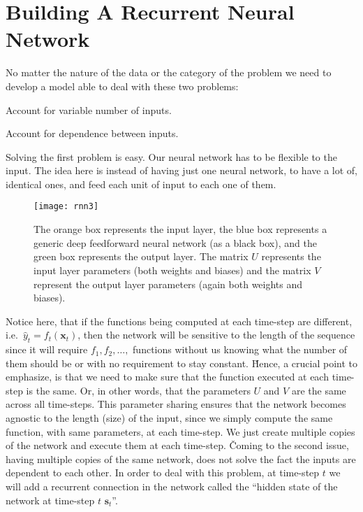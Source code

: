\section{Building A Recurrent Neural Network}

No matter the nature of the data or the category of the problem we need to develop a model able to deal with these
two problems:
\bit
\item Account for variable number of inputs.
\item Account for dependence between inputs.
\eit

Solving the first problem is easy. Our neural network has to be flexible to the input. The idea here is instead of
having just one neural network, to have a lot of, identical ones, and feed each unit of input to each one of them.

\begin{figure}[H]
\texttt{[image: rnn3]}
\centering
\captionsetup{labelformat=empty}
\caption{The orange box represents the input layer, the blue box represents a generic deep feedforward neural
network (as a black box), and the green box represents the output layer. The matrix $U$ represents the input layer
parameters (both weights and biases) and the matrix $V$ represent the output layer parameters (again both weights and
biases).}
\end{figure}

Notice here, that if the functions being computed at each time-step are different, i.e.\ $\hat{y}_t = f_t(\boldsymbol{x}_{t})$,
then the network will be sensitive to the length of the sequence since it will require $f_1, f_2, \ldots,$ functions
without us knowing what the number of them should be or with no requirement to stay constant. \v

Hence, a crucial point to emphasize, is that we need to make sure that the function executed at each time-step is the
same. Or, in other words, that the parameters $U$ and $V$ are the same across all time-steps. This parameter sharing
ensures that the network becomes agnostic to the length (size) of the input, since we simply compute the same
function, with same parameters, at each time-step. We just create multiple copies of the network and execute them at
each time-step. \v

Coming to the second issue, having multiple copies of the same network, does not solve the fact the inputs are
dependent to each other. In order to deal with this problem, at time-step $t$ we will add a recurrent connection in the
network called the ``hidden state of the network at time-step $t$ $\boldsymbol{s}_{t}$''.

